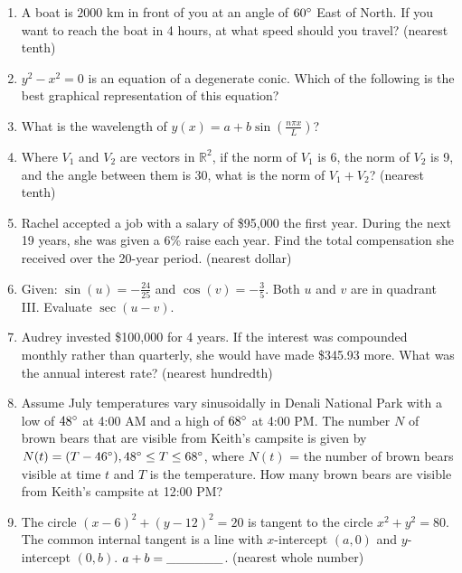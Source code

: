 \documentclass[../uilmath.tex]{subfiles}
\begin{document}
\begin{enumerate}[label=\bfseries\arabic*.]
    \item %
    A boat is $2000$ km in front of you at an angle of $60\degree$ East of North. If you want to reach the boat in 4 hours, at what speed should you travel? (nearest tenth)

    \item %
    $y^2-x^2=0$ is an equation of a degenerate conic. Which of the following is the best graphical representation of this equation?

    \item %
    What is the wavelength of $y(x)=a+b\sin\left(\frac{n\pi x}{L}\right)$?

    \item %
    Where $V_1$ and $V_2$ are vectors in $\mathbb{R}^2$, if the norm of $V_1$ is 6, the norm of $V_2$ is 9, and the angle between them is 30,
    what is the norm of $V_1+V_2$? (nearest tenth)

    \item %
    Rachel accepted a job with a salary of \$95,000 the first year. During the next 19 years, she was given a 6\% raise each year. Find the total compensation she received over the 20-year period. (nearest dollar)

    \item %
    Given: $\sin(u)=-\frac{24}{25}$ and $\cos(v)=-\frac{3}{5}$. Both $u$ and $v$ are in quadrant III. Evaluate $\sec(u-v)$.

    \item %
    Audrey invested \$100,000 for 4 years. If the interest was compounded monthly rather than quarterly, she would have made \$345.93 more. What was the annual interest rate? (nearest hundredth)

    \item %
    Assume July temperatures vary sinusoidally in Denali National Park with a low of $48\degree$ at 4:00 AM and a high of $68\degree$ at 4:00 PM. The number $N$ of brown bears that are visible from Keith's campsite is given by $N(t)=(T-46\degree), 48\degree\leq T\leq 68\degree$, where $N(t)$ = the number of brown bears visible at time $t$ and $T$ is the temperature. How many brown bears are visible from Keith's campsite at 12:00 PM?

    \item %
    The circle $(x-6)^2+(y-12)^2=20$ is tangent to the circle $x^2+y^2=80$. The common internal tangent is a line with $x$-intercept $(a,0)$ and $y$-intercept $(0,b)$. $a+b=\_\_\_\_\_\_$. (nearest whole number)


\end{enumerate}
\end{document}
